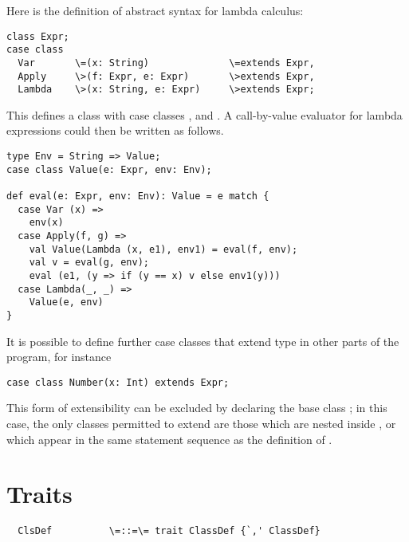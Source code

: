 \documentclass[11pt]{report}
\begin{document}
\example Here is the definition of abstract syntax for lambda
calculus:

\begin{verbatim}
class Expr;
case class
  Var       \=(x: String)              \=extends Expr,
  Apply     \>(f: Expr, e: Expr)       \>extends Expr,
  Lambda    \>(x: String, e: Expr)     \>extends Expr;
\end{verbatim}
This defines a class \verb@Expr@ with case classes
\verb@Var@, \verb@Apply@ and \verb@Lambda@. A call-by-value evaluator for lambda
expressions could then be written as follows.

\begin{verbatim}
type Env = String => Value;
case class Value(e: Expr, env: Env);

def eval(e: Expr, env: Env): Value = e match {
  case Var (x) =>
    env(x)
  case Apply(f, g) =>
    val Value(Lambda (x, e1), env1) = eval(f, env);
    val v = eval(g, env);
    eval (e1, (y => if (y == x) v else env1(y)))
  case Lambda(_, _) =>
    Value(e, env)
}
\end{verbatim}

It is possible to define further case classes that extend type
\verb@Expr@ in other parts of the program, for instance
\begin{verbatim}
case class Number(x: Int) extends Expr;
\end{verbatim}

This form of extensibility can be excluded by declaring the base class
\verb@Expr@ \verb@sealed@; in this case, the only classes permitted to
extend \verb@Expr@ are those which are nested inside \verb@Expr@, or
which appear in the same statement sequence as the definition of
\verb@Expr@.

\section{Traits}

\label{sec:traits}

\syntax\begin{verbatim}
  ClsDef          \=::=\= trait ClassDef {`,' ClassDef}
\end{verbatim}
\end{document}
